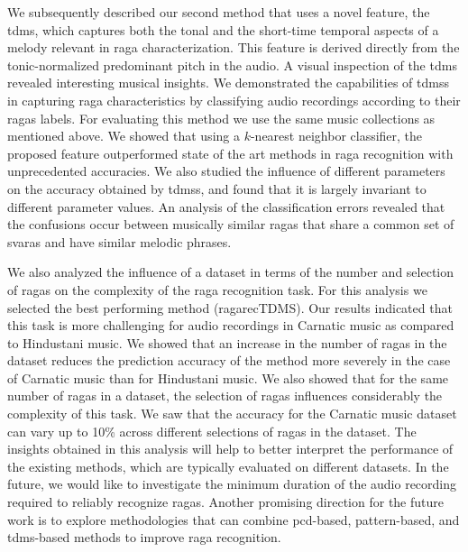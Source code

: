 We subsequently described our second method that uses a novel feature, the \acrshort{tdms}, which captures both the tonal and the short-time temporal aspects of a melody relevant in \gls{raga} characterization. This feature is derived directly from the tonic-normalized predominant pitch in the audio. A visual inspection of the \acrshort{tdms} revealed interesting musical insights. We demonstrated the capabilities of \glspl{tdms} in capturing \gls{raga} characteristics by classifying audio recordings according to their \glspl{raga} labels. For evaluating this method we use the same music collections as mentioned above. We showed that using a $k$-nearest neighbor classifier, the proposed feature outperformed state of the art methods in \gls{raga} recognition with unprecedented accuracies. We also studied the influence of different parameters on the accuracy obtained by \glspl{tdms}, and found that it is largely invariant to different parameter values. An analysis of the classification errors revealed that the confusions occur between musically similar \glspl{raga} that share a common set of \glspl{svara} and have similar melodic phrases. 

We also analyzed the influence of a dataset in terms of the number and selection of \glspl{raga} on the complexity of the \gls{raga} recognition task. For this analysis we selected the best performing method (\acrshort{ragarecTDMS}). Our results indicated that this task is more challenging for audio recordings in Carnatic music as compared to Hindustani music. We showed that an increase in the number of \glspl{raga} in the dataset reduces the prediction accuracy of the method more severely in the case of Carnatic music than for Hindustani music. We also showed that for the same number of \glspl{raga} in a dataset, the selection of \glspl{raga} influences considerably the complexity of this task. We saw that the accuracy for the Carnatic music dataset can vary up to 10\% across different selections of \glspl{raga} in the dataset. The insights obtained in this analysis will help to better interpret the performance of the existing methods, which are typically evaluated on different datasets. In the future, we would like to investigate the minimum duration of the audio recording required to reliably recognize \glspl{raga}. Another promising direction for the future work is to explore methodologies that can combine \gls{pcd}-based, pattern-based, and \gls{tdms}-based methods to improve \gls{raga} recognition.

